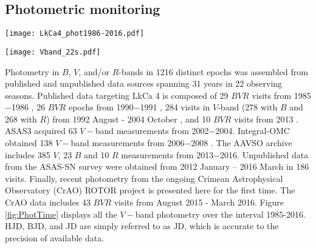 \documentclass[twocolumn]{emulateapj}%
\newcommand{\name}{LkCa 4 }
\begin{document}
\subsection{Photometric monitoring}

\begin{figure*}
 \centering
 \texttt{[image: LkCa4\_phot1986-2016.pdf]}
 \caption{Overview of \name $V-$band photometric monitoring from 1986$-$2016.  The vertical lines denote the observing epochs of 2MASS, IGRINS, ESPaDOnS, DBSP, and TripleSpec.  The near contemporaneous DBSP and TripleSpec epochs lay on top of each other on this scale, as do the 12 ESPaDOnS epochs.  The abscissa range is equal to the current lifespan of the first author of this paper.}
 \label{fig:PhotTime}
\end{figure*}

\begin{figure*}
 \centering
 \texttt{[image: Vband\_22s.pdf]}
 \caption{Phase-folded lightcurves constructed assuming $P=3.375$ days for all 22 observing seasons.  The blue solid lines show a ``multiterm'' regularized periodic fit, that is, keeping the first $M_{\rm max}=4$ Fourier components \citep{vanderplas15a}.  The vertical lines show the epochs at which spectra or ancillary photometry were obtained, with the same line styles and colors as Figure \ref{fig:PhotTime}.  LkCa 4 shows secular changess in its light curve morphology.  The IGRINS spectrum was acquired near the median flux level of the season.}
 \label{fig:PhotPhase}
\end{figure*}

Photometry in $B$, $V$, and/or $R$-bands in 1216 distinct epochs was assembled from published and unpublished data sources spanning 31 years in 22 observing seasons.  Published data targeting \name is composed of 29 $BVR$ visits from 1985$-$1986 \citep{vrba93}, 26 $BVR$ epochs from 1990$-$1991 \citep{bouvier93}, 284 visits in $V$-band (278 with $B$ and 268 with $R$) from 1992 August - 2004 October \citep{grankin08}, and 10 $BVR$ visits from 2013 \citep{donati14}.  ASAS3 \citep{pojmanski04} acquired 63 $V-$band measurements from 2002$-$2004.  Integral-OMC obtained 138 $V-$band measurements from 2006$-$2008 \citep{garzon12}.  The AAVSO archive \citep{kafka16} includes 385 $V$, 23 $B$ and 10 $R$ measurements from 2013$-$2016.  Unpublished data from the ASAS-SN survey \citep{shappee14} were obtained from 2012 January -- 2016 March in 186 visits.  Finally, recent photometry from the ongoing Crimean Astrophysical Observatory (CrAO) ROTOR project \citep{grankin08} is presented here for the first time.  The CrAO data includes 43 $BVR$ visits from August 2015 - March 2016. Figure \ref{fig:PhotTime} displays all the $V-$band photometry over the interval 1985-2016.  HJD, BJD, and JD are simply referred to as JD, which is accurate to the precision of available data.
\end{document}
